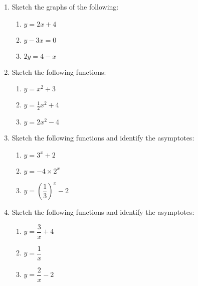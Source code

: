 \begin{eocexercises}{}
  \begin{enumerate}[itemsep=9pt, label=\textbf{\arabic*}. ] 
  \item Sketch the graphs of the following: 
\begin{multicols}{3}
    \begin{enumerate}[noitemsep, label=\textbf{(\alph*)} ]
    \item $y=2x+4$ 
    \item $y-3x=0$ 
    \item $2y=4-x$
    \end{enumerate}
\end{multicols}
  \item Sketch the following functions: 
\begin{multicols}{3}
    \begin{enumerate}[noitemsep, label=\textbf{(\alph*)} ] %
    \item $y=x^{2}+3$ 
    \item $y=\frac{1}{2}x^{2}+4$
    \item $y=2x^{2}-4$
    \end{enumerate}
\end{multicols}
  \item Sketch the following functions and identify the asymptotes: 
\begin{multicols}{3}
    \begin{enumerate}[noitemsep, label=\textbf{(\alph*)} ]  %
    \item $y=3^{x}+2$ 
    \item $y=-4 \times 2^{x}$ 
    \item $y=\left(\dfrac{1}{3}\right)^{x}-2$ 
    \end{enumerate}
\end{multicols}
  \item Sketch the following functions and identify the asymptotes: 
\begin{multicols}{3}
    \begin{enumerate}[noitemsep, label=\textbf{(\alph*)} ] %
    \item $y=\dfrac{3}{x}+4$ 
    \item $y=\dfrac{1}{x}$ 
    \item $y=\dfrac{2}{x}-2$ 

\end{enumerate}
\end{multicols}
\end{enumerate}
\end{eocexercises}
